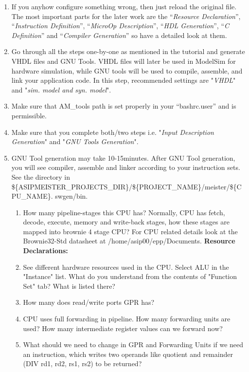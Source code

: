 \begin{enumerate}
\begin{enumerate}
	\item If you anyhow configure something wrong, then just reload the original file. The most important parts for the later work are the ``\emph{Resource Declaration}'', ``\emph{Instruction Definition}'', 	``\emph{MicroOp Description}'', ``\emph{HDL Generation}'', ``\emph{C Definition}'' and ``\emph{Compiler Generation}'' so have a detailed look at them.
	\item Go through all the steps one-by-one as mentioned in the tutorial and
	generate VHDL files and GNU Tools. VHDL files will later be used in ModelSim for hardware simulation, while GNU tools will be used to compile, assemble, and link your application code. In this step, recommended settings are "\emph{VHDL}" and "\emph{sim. model and syn. model}".
	\item Make sure that AM\_tools path is set properly in your ``bashrc.user'' and is permissible.
	\item Make sure that you complete both/two steps i.e. "\emph{Input Description Generation}" and "\emph{GNU Tools Generation}".
	\item GNU Tool generation may take 10-15minutes. After GNU Tool generation, you will see compiler, assemble and linker according to your instruction sets. See the directory in \$\{ASIPMEISTER\_PROJECTS\_DIR\}/\$\{PROJECT\_NAME\}/meister/\$\{CPU\_NAME\}.
	swgen/bin.
		\begin{enumerate}[label=(\alph*)]
		\color{red}\item\normalcolor How many pipeline-stages this CPU has? Normally, CPU has fetch, decode, execute, memory and write-back stages, how these stages are mapped into brownie 4 stage CPU? For CPU related details look at the Brownie32-Std datasheet at /home/asip00/epp/Documents.
		\newline\textbf{Resource Declarations:}
		\color{red}\item\normalcolor  See different hardware resources used in the CPU. Select ALU in the "Instance" list. What do you understand from the contents of "Function Set" tab? What is listed there?
		\color{red}\item\normalcolor  How many does read/write ports GPR has?
		\color{red}\item\normalcolor  CPU uses full forwarding in pipeline. How many forwarding units are used? How many intermediate register values can we forward now?
		\color{red}\item\normalcolor  What should we need to change in GPR and Forwarding Units if we need an instruction, which writes two operands like quotient and remainder (DIV rd1, rd2, rs1, rs2) to be returned?

\end{enumerate}
\end{enumerate}
\end{enumerate}

